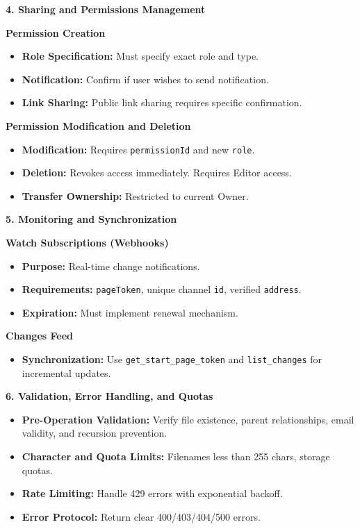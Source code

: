 \begin{taskbox}
\textbf{4. Sharing and Permissions Management}

\textbf{Permission Creation}
\begin{itemize}
\item \textbf{Role Specification:} Must specify exact role and type.
\item \textbf{Notification:} Confirm if user wishes to send notification.
\item \textbf{Link Sharing:} Public link sharing requires specific confirmation.
\end{itemize}

\textbf{Permission Modification and Deletion}
\begin{itemize}
\item \textbf{Modification:} Requires \texttt{permissionId} and new \texttt{role}.
\item \textbf{Deletion:} Revokes access immediately. Requires Editor access.
\item \textbf{Transfer Ownership:} Restricted to current Owner.
\end{itemize}

\textbf{5. Monitoring and Synchronization}

\textbf{Watch Subscriptions (Webhooks)}
\begin{itemize}
\item \textbf{Purpose:} Real-time change notifications.
\item \textbf{Requirements:} \texttt{pageToken}, unique channel \texttt{id}, verified \texttt{address}.
\item \textbf{Expiration:} Must implement renewal mechanism.
\end{itemize}

\textbf{Changes Feed}
\begin{itemize}
\item \textbf{Synchronization:} Use \texttt{get\_start\_page\_token} and \texttt{list\_changes} for incremental updates.
\end{itemize}

\textbf{6. Validation, Error Handling, and Quotas}

\begin{itemize}
\item \textbf{Pre-Operation Validation:} Verify file existence, parent relationships, email validity, and recursion prevention.
\item \textbf{Character and Quota Limits:} Filenames less than 255 chars, storage quotas.
\item \textbf{Rate Limiting:} Handle 429 errors with exponential backoff.
\item \textbf{Error Protocol:} Return clear 400/403/404/500 errors.
\end{itemize}


\end{taskbox}
